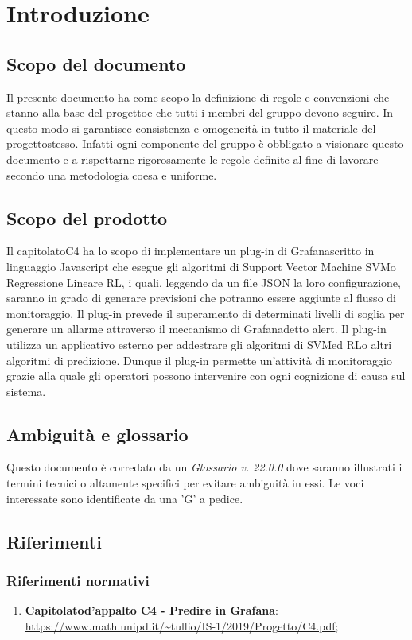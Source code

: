 \section{Introduzione}
\subsection{Scopo del documento}
Il presente documento ha come scopo la definizione di regole e convenzioni che stanno alla base del progetto\glosp e che tutti i membri del gruppo devono seguire. In questo modo si garantisce consistenza e omogeneità in tutto il materiale del progetto\glosp stesso. Infatti ogni componente del gruppo è obbligato a visionare questo documento e a rispettarne rigorosamente le regole definite al fine di lavorare secondo una metodologia coesa e uniforme.
\subsection{Scopo del prodotto}
Il capitolato\glosp C4 ha lo scopo di implementare un plug-in di Grafana\glosp scritto in linguaggio Javascript che esegue gli algoritmi di Support Vector Machine SVM\glosp o Regressione Lineare RL\glo, i quali, leggendo da un file JSON la loro configurazione, saranno in grado di generare previsioni che potranno essere aggiunte al flusso di monitoraggio. Il plug-in prevede il superamento di determinati livelli di soglia per generare un allarme attraverso il meccanismo di Grafana\glosp detto alert\glo. Il plug-in utilizza un applicativo esterno per addestrare gli algoritmi di SVM\glosp ed RL\glosp o altri algoritmi di predizione.
Dunque il plug-in permette un'attività di monitoraggio grazie alla quale gli operatori possono intervenire con ogni cognizione di causa sul sistema.
\subsection{Ambiguità e glossario}
Questo documento è corredato da un \textit{Glossario v. 22.0.0} dove saranno illustrati i termini tecnici o altamente specifici per evitare ambiguità in essi. Le voci interessate sono identificate da una 'G' a pedice.
\subsection{Riferimenti}
\subsubsection{Riferimenti normativi}
\begin{enumerate}
	\item \textbf{Capitolato}\glosp \textbf{d'appalto C4 - Predire in Grafana}\glo: \url{https://www.math.unipd.it/~tullio/IS-1/2019/Progetto/C4.pdf};
\end{enumerate}
